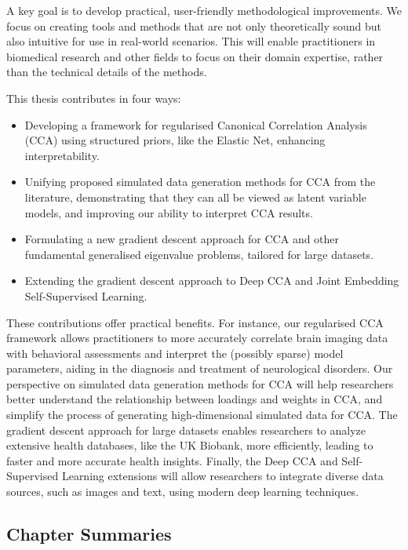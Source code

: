 A key goal is to develop practical, user-friendly methodological improvements.
We focus on creating tools and methods that are not only theoretically sound but also intuitive for use in real-world scenarios.
This will enable practitioners in biomedical research and other fields to focus on their domain expertise, rather than the technical details of the methods.

This thesis contributes in four ways:

\begin{itemize}
    \item Developing a framework for regularised Canonical Correlation Analysis (CCA) using structured priors, like the Elastic Net, enhancing interpretability.
    \item Unifying proposed simulated data generation methods for CCA from the literature, demonstrating that they can all be viewed as latent variable models, and improving our ability to interpret CCA results.
    \item Formulating a new gradient descent approach for CCA and other fundamental generalised eigenvalue problems, tailored for large datasets.
    \item Extending the gradient descent approach to Deep CCA and Joint Embedding Self-Supervised Learning.
\end{itemize}

These contributions offer practical benefits.
For instance, our regularised CCA framework allows practitioners to more accurately correlate brain imaging data with behavioral assessments and interpret the (possibly sparse) model parameters, aiding in the diagnosis and treatment of neurological disorders.
Our perspective on simulated data generation methods for CCA will help researchers better understand the relationship between loadings and weights in CCA, and simplify the process of generating high-dimensional simulated data for CCA.
The gradient descent approach for large datasets enables researchers to analyze extensive health databases, like the UK Biobank, more efficiently, leading to faster and more accurate health insights.
Finally, the Deep CCA and Self-Supervised Learning extensions will allow researchers to integrate diverse data sources, such as images and text, using modern deep learning techniques.

\subsection{Chapter Summaries}

